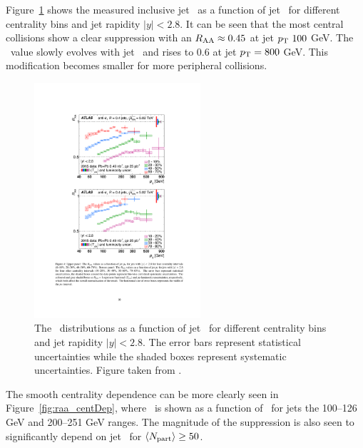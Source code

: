 Figure~\ref{fig:raa} shows the measured inclusive jet \RAA\ as a function of jet \pt\ for different centrality bins and jet rapidity $|y| < 2.8$. It can be seen that the most central collisions show a clear suppression with an $\mbox{$R_{\rm AA}$} \approx 0.45$ at jet $\mbox{$p_{\mathrm{T}}$}\ 100$ GeV. The \RAA\ value slowly evolves with jet \pt\ and rises to 0.6 at jet $\mbox{$p_{\mathrm{T}}$} = 800$ GeV. This modification becomes smaller for more peripheral collisions. 

\begin{figure}[htbp]
\begin{center}
\includegraphics[width=0.55\textwidth]{figures/jetMeasurements/raa}
\caption{The \RAA\ distributions as a function of jet \pt\ for different centrality bins and jet rapidity $|y| < 2.8$. The error bars represent statistical uncertainties while the shaded boxes represent systematic uncertainties. Figure taken from \cite{2019108}.}
\label{fig:raa}
\end{center}
\end{figure}

The smooth centrality dependence can be more clearly seen in Figure~\ref{fig:raa_centDep}, where \RAA\ is shown as a function of \ANpart\ for jets the 100--126 GeV and 200--251 GeV ranges. The magnitude of the suppression is also seen to significantly depend on jet \pt\ for $\mbox{$\langle N_{\mathrm{part}}\rangle$} \geq 50$. 

